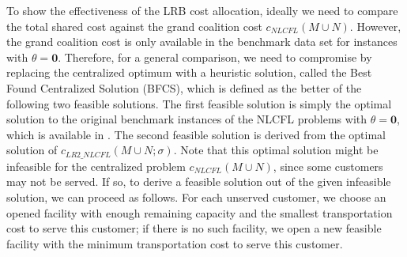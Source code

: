 \documentclass[ijoc,nonblindrev]{informs3} %
\begin{document}
To show the effectiveness of the LRB cost allocation, ideally we need to compare the total shared cost against the grand coalition cost $c_{NLCFL}(M \cup N)$.
However, the grand coalition cost is only available in the benchmark data set for instances with $\theta=\textbf{0}$. 
Therefore, for a general comparison, we need to compromise by replacing the centralized optimum with a heuristic solution, called the Best Found Centralized Solution (BFCS), which is defined as the better of the following two feasible solutions.
The first feasible solution is simply the optimal solution to the original benchmark instances of the NLCFL problems with $\theta = \textbf{0}$, which is available in \cite{Bachrach2009Cost}.
The second feasible solution is derived from the optimal solution of $c_{LR2\_NLCFL}(M \cup N;\sigma)$.
Note that this optimal solution might be infeasible for the centralized problem $c_{NLCFL}(M \cup N)$, since some customers may not be served. 
If so, to derive a feasible solution out of the given infeasible solution, we can proceed as follows. 
For each unserved customer, we choose an opened facility with enough remaining capacity and the smallest transportation cost to serve this customer; if there is no such facility, we open a new feasible facility with the minimum transportation cost to serve this customer.
\end{document}
